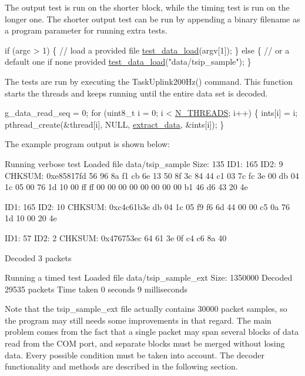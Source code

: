 The output test is run on the shorter block, while the timing test is run on the longer one. The shorter output test can be run by appending a binary filename as a program parameter for running extra tests.


\begin{DoxyCodeInclude}
  \textcolor{keywordflow}{if} (argc > 1) \{
    \textcolor{comment}{// load a provided file}
    \hyperlink{uavnav__main_8c_aad6066d9ede8cbf9b9d5e4fa28236380}{test\_data\_load}(argv[1]);
  \} \textcolor{keywordflow}{else} \{
    \textcolor{comment}{// or a default one if none provided}
    \hyperlink{uavnav__main_8c_aad6066d9ede8cbf9b9d5e4fa28236380}{test\_data\_load}(\textcolor{stringliteral}{"data/tsip\_sample"});
  \}
\end{DoxyCodeInclude}


The tests are run by executing the Task\+Uplink200\+Hz() command. This function starts the threads and keeps running until the entire data set is decoded.


\begin{DoxyCodeInclude}
  g\_data\_read\_seq = 0;
  \textcolor{keywordflow}{for} (uint8\_t i = 0; i < \hyperlink{tsip__decode_8h_ab60b5074c740fd36061f48f90d1a0b21}{N\_THREADS}; i++) \{
    ints[i] = i;
    pthread\_create(&thread[i], NULL, \hyperlink{tsip__decode_8h_a12e6599a2b96dd309e86e6fbb868a5d8}{extract\_data}, &ints[i]);
  \}
\end{DoxyCodeInclude}
 The example program output is shown below\+:

\begin{DoxyVerb}Running verbose test
Loaded file data/tsip_sample
Size: 135
ID1: 165 ID2: 9 CHKSUM: 0xe85817fd
56 96 8a f1
cb 6e 13 50
8f 3c 84 44
c1 03 7c fc
3e 00 db 04
1c 05 00 76
1d 10 00 ff
ff 00 00 00
00 00 00 00
00 b1 46 d6
43 20 4e

ID1: 165 ID2: 10 CHKSUM: 0xc4c61b3e
db 04 1c 05
f9 f6 6d 44
00 00 c5 0a
76 1d 10 00
20 4e

ID1: 57 ID2: 2 CHKSUM: 0x476753ec
64 61 3e 0f
c4 c6 8a 40


Decoded 3 packets

Running a timed test
Loaded file data/tsip_sample_ext
Size: 1350000
Decoded 29535 packets
Time taken 0 seconds 9 milliseconds
\end{DoxyVerb}


Note that the tsip\+\_\+sample\+\_\+ext file actually contains 30000 packet samples, so the program may still needs some improvements in that regard. The main problem comes from the fact that a single packet may span several blocks of data read from the C\+OM port, and separate blocks must be merged without losing data. Every possible condition must be taken into account. The decoder functionality and methods are described in the following section.

